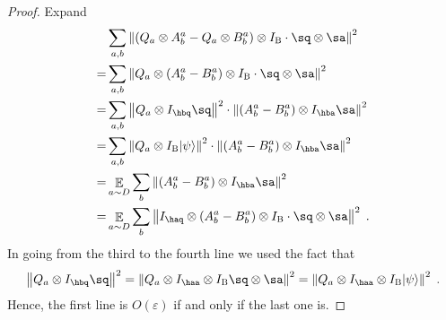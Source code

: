 \documentclass[11pt]{article}
\theoremstyle{definition}
\newcommand{\ket}[1]{|#1\rangle}
\newcommand{\Id}{\ensuremath{I}}
\newcommand{\eps}{\varepsilon}
\newcommand{\norm}[1]{\left\| {#1} \right\|}
\newcommand{\E}{\mathop{\mathbb{E}}\displaylimits} %
\newcommand{\labelstyle}[1]{\ensuremath{\textsc{#1}}\xspace}
\newcommand{\bob}{\labelstyle{B}}
\begin{document}
\begin{proof}
 Expand
  \begin{align*}
    & \sum_{a,b} \norm{ (Q_a \otimes A^a_b - Q_a \otimes B^a_b) \otimes
      \Id_{\bob} \cdot \sq \otimes \sa }^2\\
    = & \sum_{a,b} \norm{ Q_a \otimes (A^a_b -  B^a_b) \otimes
        \Id_{\bob} \cdot \sq \otimes \sa}^2\\
    = & \sum_{a, b} \norm{ Q_a \otimes I_{\hbq} \sq}^2 \cdot
        \norm{  (A^a_b -  B^a_b) \otimes \Id_{\hba} \sa }^2\\
	= & \sum_{a, b} \norm{ Q_a \otimes \Id_{\bob} \ket{\psi}}^2 \cdot
      \norm{  (A^a_b -  B^a_b) \otimes \Id_{\hba} \sa }^2\\
    = & \E_{a \sim D} \sum_{b}
        \norm{  (A^a_b -  B^a_b) \otimes \Id_{\hba} \sa }^2\\
    = & \E_{a \sim D} \sum_{b}
      \norm{  \Id_{\haq} \otimes (A^a_b -  B^a_b) \otimes
        \Id_{\bob} \cdot \sq \otimes \sa }^2\;.
  \end{align*}
  In going from the third to the fourth line we used the fact that
  \[
    \norm{ Q_a \otimes I_{\hbq} \sq }^2 =
    \norm{ Q_a \otimes \Id_{\haa} \otimes I_{\bob} \sq \otimes \sa }^2
    = \norm{ Q_a \otimes \Id_{\haa} \otimes \Id_{\bob} \ket{\psi} }^2\;.
  \]
  Hence, the first line is $O(\eps)$ if and only if the last one is.
\end{proof}
\end{document}
